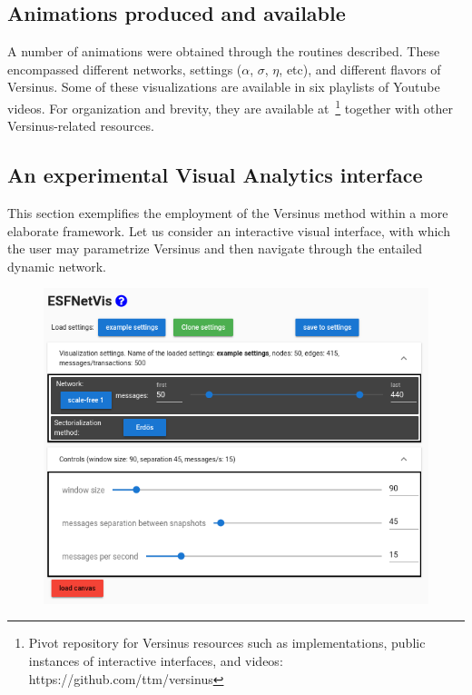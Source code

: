 \documentclass[runningheads]{llncs}
\begin{document}
\subsection{Animations produced and available}\label{sec:vid}
A number of animations were obtained through the routines described.
These encompassed different networks, settings ($\alpha$, $\sigma$, $\eta$,
etc), and different flavors of Versinus.
Some of these visualizations are available in six playlists of Youtube videos.
For organization and brevity, they are available at~\footnote{Pivot repository for Versinus resources such as implementations, public instances of interactive interfaces, and videos: https://github.com/ttm/versinus} together with other Versinus-related resources.

\subsection{An experimental Visual Analytics interface}
This section exemplifies the employment of the Versinus method
within a more elaborate framework.
Let us consider an interactive visual interface, with which the user may parametrize Versinus and then navigate through the entailed dynamic network.

\begin{figure}[!h]\centering
\includegraphics[width=\textwidth]{esfNetVis___}
  \caption{
  }\label{esfnetvis}
\end{figure}
\end{document}
